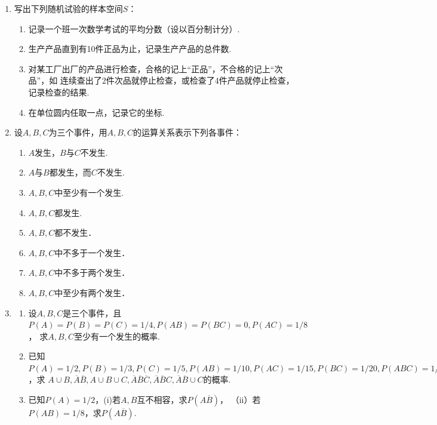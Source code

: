 \documentclass[10pt,a4paper]{article}
\begin{document}
\begin{enumerate}
    
    \item 写出下列随机试验的样本空间$S$：
    \begin{enumerate}
        \item 记录一个班一次数学考试的平均分数（设以百分制计分）.
        \item 生产产品直到有10件正品为止，记录生产产品的总件数.
        \item 对某工厂出厂的产品进行检查，合格的记上“正品”，不合格的记上“次品”，如
        连续查出了2件次品就停止检查，或检查了4件产品就停止检查，记录检查的结果.
        \item 在单位圆内任取一点，记录它的坐标.
    \end{enumerate}



    \item 设$A,B,C$为三个事件，用$A,B,C$的运算关系表示下列各事件：
    \begin{enumerate}
        \item $A$发生，$B$与$C$不发生.
        \item $A$与$B$都发生，而$C$不发生.
        \item $A,B,C$中至少有一个发生.
        \item $A,B,C$都发生.
        \item $A,B,C$都不发生．
        \item $A,B,C$中不多于一个发生．
        \item $A,B,C$中不多于两个发生．
        \item $A,B,C$中至少有两个发生．
    \end{enumerate}



    \item \begin{enumerate}
        \item 设$A,B,C$是三个事件，且$P(A)=P(B)=P(C)=1/4,P(AB)=P(BC)=0,P(AC)=1/8$，
        求$A,B,C$至少有一个发生的概率.
        \item 已知$P(A)=1/2,P(B)=1/3,P(C)=1/5,P(AB)=1/10,P(AC)=1/15,P(BC)=1/20,P(ABC)=1/30$，求
        $A\cup B,\overline{A} \overline{B},A\cup B\cup C,\overline{A}\overline{B}\overline{C},\overline{A}\overline{B}C,\overline{A}\overline{B}\cup C$的概率.
        \item 已知$P(A)=1/2$，(i)若$A,B$互不相容，求$P(A\overline{B})$，
        （ii）若$P(AB)=1/8$，求$P(A\overline{B})$.
    \end{enumerate}



\end{enumerate}
\end{document}
